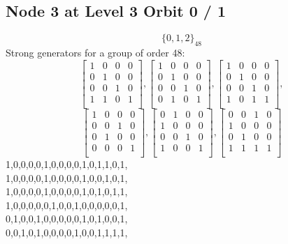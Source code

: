 \subsection*{Node 3 at Level 3 Orbit 0 / 1}
$$
\{ 0, 1, 2 \}_{48}$$
{\small\arraycolsep=2pt
Strong generators for a group of order 48:
$$
\left[
\begin{array}{*{4}{r}}
1 & 0 & 0 & 0\\
0 & 1 & 0 & 0\\
0 & 0 & 1 & 0\\
1 & 1 & 0 & 1\\
\end{array}
\right]
, 
\left[
\begin{array}{*{4}{r}}
1 & 0 & 0 & 0\\
0 & 1 & 0 & 0\\
0 & 0 & 1 & 0\\
0 & 1 & 0 & 1\\
\end{array}
\right]
, 
\left[
\begin{array}{*{4}{r}}
1 & 0 & 0 & 0\\
0 & 1 & 0 & 0\\
0 & 0 & 1 & 0\\
1 & 0 & 1 & 1\\
\end{array}
\right]
, 
$$
$$
\left[
\begin{array}{*{4}{r}}
1 & 0 & 0 & 0\\
0 & 0 & 1 & 0\\
0 & 1 & 0 & 0\\
0 & 0 & 0 & 1\\
\end{array}
\right]
, 
\left[
\begin{array}{*{4}{r}}
0 & 1 & 0 & 0\\
1 & 0 & 0 & 0\\
0 & 0 & 1 & 0\\
1 & 0 & 0 & 1\\
\end{array}
\right]
, 
\left[
\begin{array}{*{4}{r}}
0 & 0 & 1 & 0\\
1 & 0 & 0 & 0\\
0 & 1 & 0 & 0\\
1 & 1 & 1 & 1\\
\end{array}
\right]
$$
1,0,0,0,0,1,0,0,0,0,1,0,1,1,0,1,\\
1,0,0,0,0,1,0,0,0,0,1,0,0,1,0,1,\\
1,0,0,0,0,1,0,0,0,0,1,0,1,0,1,1,\\
1,0,0,0,0,0,1,0,0,1,0,0,0,0,0,1,\\
0,1,0,0,1,0,0,0,0,0,1,0,1,0,0,1,\\
0,0,1,0,1,0,0,0,0,1,0,0,1,1,1,1,\\
}
